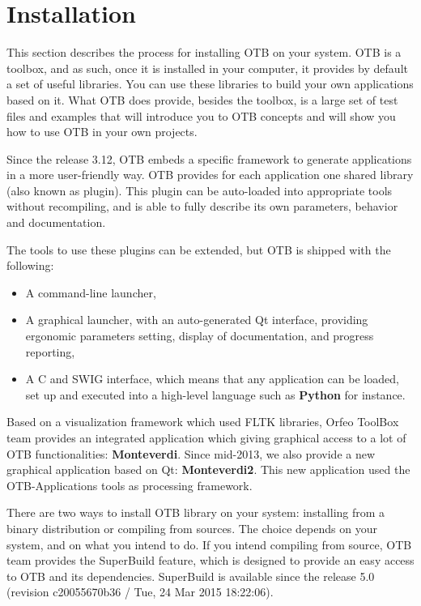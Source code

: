 \setcounter{secnumdepth}{3}

\chapter{Installation}
\label{chapter:Installation}

This section describes the process for installing OTB on your system. OTB is a toolbox, and as such, once it is installed in your computer, it provides by default a set of useful libraries. You can use these libraries to build your own applications based on it. What OTB does provide, besides the toolbox, is a large set of test files and examples that will introduce you to OTB concepts and will show you how to use OTB in your own projects.

Since the release 3.12, OTB embeds a specific framework to generate applications in a more user-friendly way. OTB provides for each application one shared library (also known as plugin). This plugin can be auto-loaded into appropriate tools without recompiling, and is able to fully describe its own parameters, behavior and documentation.

The tools to use these plugins can be extended, but OTB is shipped with the
following:
\begin{itemize}
\item A command-line launcher,
\item A graphical launcher, with an auto-generated Qt interface,
  providing ergonomic parameters setting, display of documentation,
  and progress reporting,
\item A C and SWIG interface, which means that any application can be
  loaded, set up and executed into a high-level language such as \textbf{Python}
  for instance.
\end{itemize}

Based on a visualization framework which used FLTK libraries, Orfeo ToolBox team provides an integrated application which giving graphical access to a lot of OTB functionalities: \textbf{Monteverdi}. Since mid-2013, we also provide a new graphical application based on Qt: \textbf{Monteverdi2}. This new application used the OTB-Applications tools as processing framework. 
   
There are two ways to install OTB library on your system: installing from a binary distribution or compiling from sources. 
The choice depends on your system, and on what you intend to do. If you intend compiling from source, OTB team provides the SuperBuild feature, which is designed to provide an easy access to OTB and its dependencies.
SuperBuild is available since the release 5.0 (revision c20055670b36 / Tue, 24 Mar 2015 18:22:06).


